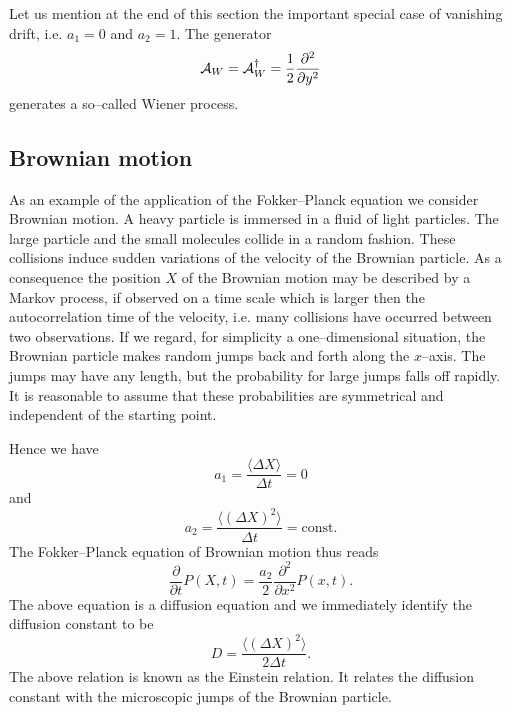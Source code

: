 Let us mention at the end of this section the important special case 
of vanishing drift, i.e. $a_1=0$ and $a_2=1$. The generator 
\begin{equation}
\label{WIENER_GENERATOR}
{\cal{A}}_W = {\cal{A}}_W^{\dagger} = \frac{1}{2} 
     \frac{\partial^2}{\partial y^2}
\end{equation}
generates a so--called Wiener process.

\subsection{Brownian motion}
As an example of the application of the Fokker--Planck
equation we consider Brownian motion. A heavy particle is immersed 
in a fluid of light particles. The large particle and the small 
molecules collide in a random fashion. These 
collisions induce sudden variations of the velocity of the 
Brownian particle. As a consequence the position $X$ of the Brownian 
motion may be described by a Markov 
process, if observed on a time scale which is larger then the 
autocorrelation time of the velocity, i.e. many collisions have 
occurred between two observations. If we regard, for simplicity a 
one--dimensional 
situation, the Brownian particle makes random jumps back and forth 
along the $x$--axis. The jumps may have any length, but the
probability for large jumps falls off rapidly. 
It is reasonable to assume that these probabilities are 
symmetrical and independent of the starting point.

Hence we have
\begin{equation*}
a_1 = \frac{\langle \Delta X \rangle}{\Delta t} = 0
\end{equation*}
and
\begin{equation}
a_2 = \frac{\langle (\Delta X)^2\rangle}{\Delta t}= \text{const}.
\end{equation}
The Fokker--Planck equation of Brownian motion thus reads
\begin{equation}
\label{BROWNIAN}
\frac{\partial}{\partial t} P(X,t) = \frac{a_2}{2} 
    \frac{\partial^2}{\partial x^2} P(x,t).
\end{equation}
The above equation is a diffusion equation and we immediately
identify the diffusion constant to be
\begin{equation}
D = \frac{\langle (\Delta X)^2\rangle}{2 \Delta t}.
\end{equation}
The above relation is known as the Einstein relation. It relates 
the diffusion constant with the microscopic jumps of the Brownian 
particle.

